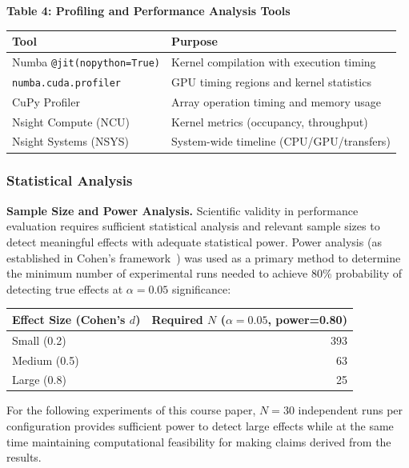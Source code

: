 \begin{center}
\textbf{Table 4: Profiling and Performance Analysis Tools}\\[0.5em]
\small
\begin{tabular}{@{}ll@{}}
\toprule
\textbf{Tool} & \textbf{Purpose} \\
\midrule
Numba \texttt{@jit(nopython=True)} & Kernel compilation with execution timing \\
\texttt{numba.cuda.profiler} & GPU timing regions and kernel statistics \\
CuPy Profiler & Array operation timing and memory usage \\
Nsight Compute (NCU) & Kernel metrics (occupancy, throughput) \\
Nsight Systems (NSYS) & System-wide timeline (CPU/GPU/transfers) \\
\bottomrule
\end{tabular}
\end{center}


\subsubsection*{Statistical Analysis}

\textbf{Sample Size and Power Analysis.} Scientific validity in performance evaluation requires sufficient statistical analysis and relevant sample sizes to detect meaningful effects with adequate statistical power. Power analysis (as established in Cohen's framework~\cite{cohen1988power}) was used as a primary method to determine the minimum number of experimental runs needed to achieve 80\% probability of detecting true effects at $\alpha=0.05$ significance:

\begin{center}
\begin{tabular}{@{}lr@{}}
\toprule
\textbf{Effect Size (Cohen's $d$)} & \textbf{Required $N$ ($\alpha=0.05$, power=0.80)} \\
\midrule
Small (0.2) & 393 \\
Medium (0.5) & 63 \\
Large (0.8) & 25 \\
\bottomrule
\end{tabular}
\end{center}
    
For the following experiments of this course paper, $N=30$ independent runs per configuration provides sufficient power to detect large effects while at the same time maintaining computational feasibility for making claims derived from the results.


